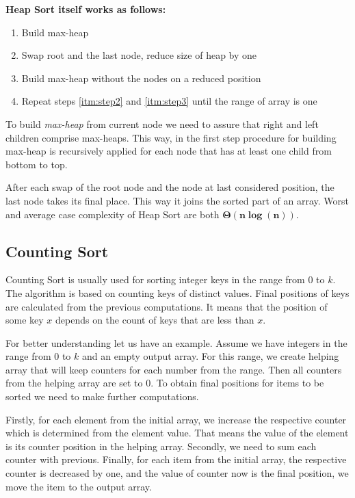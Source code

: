 \documentclass[
  field=inf,
  biblatex,
  language=english,
  glossaries,
  theorems=false,
  sourcecodes=false,
  index
]{kidiplom}
\begin{document}
\textbf{Heap Sort itself works as follows:}
\begin{enumerate}
 \item \label{itm:step1} Build max-heap
 \item \label{itm:step2} Swap root and the last node, reduce size of heap by one
 \item \label{itm:step3} Build max-heap without the nodes on a reduced position
 \item Repeat steps \ref{itm:step2} and \ref{itm:step3} until the range of array is one
\end{enumerate}

To build \textit{max-heap} from current node we need to assure that right and left children comprise max-heaps. This way, in the first step procedure for building max-heap is recursively applied for each node that has at least one child from bottom to top.

After each swap of the root node and the node at last considered position, the last node takes its final place. This way it joins the sorted part of an array. Worst and average case complexity of Heap Sort are both $\bm{\Theta(n \log(n))}$.

\subsection{Counting Sort} 
\label{sec:counting}

Counting Sort is usually used for sorting integer keys in the range from $0$ to $k$. The algorithm is based on counting keys of distinct values. Final positions of keys are calculated from the previous computations. It means that the position of some key $x$ depends on the count of keys that are less than $x$.

For better understanding let us have an example. Assume we have integers in the range from $0$ to $k$ and an empty output array. For this range, we create helping array that will keep counters for each number from the range. Then all counters from the helping array are set to $0$. To obtain final positions for items to be sorted we need to make further computations.

Firstly, for each element from the initial array, we increase the respective counter which is determined from the element value. That means the value of the element is its counter position in the helping array. Secondly, we need to sum each counter with previous. Finally, for each item from the initial array, the respective counter is decreased by one, and the value of counter now is the final position, we move the item to the output array.
\end{document}
